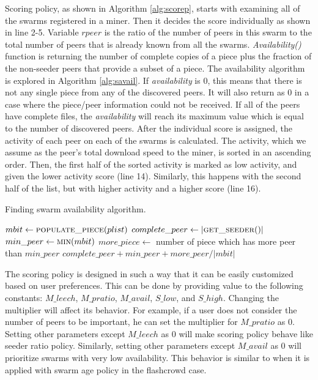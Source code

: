 Scoring policy, as shown in Algorithm \ref{alg:scorep}, starts with examining all of the swarms registered in a miner. Then it decides the score individually as shown in line 2-5. Variable $rpeer$ is the ratio of the number of peers in this swarm to the total number of peers that is already known from all the swarms. \textit{Availability()} function is returning the number of complete copies of a piece plus the fraction of the non-seeder peers that provide a subset of a piece. The availability algorithm is explored in Algorithm \ref{alg:savail}. If \textit{availability} is 0, this means that there is not any single piece from any of the discovered peers. It will also return as 0 in a case where the piece/peer information could not be received. If all of the peers have complete files, the \textit{availability} will reach its maximum value which is equal to the number of discovered peers. After the individual score is assigned, the activity of each peer on each of the swarms is calculated. The activity, which we assume as the peer's total download speed to the miner, is sorted in an ascending order. Then, the first half of the sorted activity is marked as low activity, and given the lower activity score (line 14). Similarly, this happens with the second half of the list, but with higher activity and a higher score (line 16).

\begin{algorithm}[h]
	\caption{Finding swarm availability algorithm.}
	\label{alg:savail}
	\begin{algorithmic}[1]
		\State $mbit \gets \Call{populate\_piece}{plist}$
		\State $complete\_peer \gets |\Call{get\_seeder}{\null}|$ 
		\State $min\_peer \gets \Call{min}{mbit}$
		\State $more\_piece \gets $ number of piece which has more peer than $min\_peer$
		\State \Return $complete\_peer + min\_peer + more\_peer/|mbit|$
	\end{algorithmic}
\end{algorithm}

The scoring policy is designed in such a way that it can be easily customized based on user preferences. This can be done by providing value to the following constants: $M\_leech$, $M\_pratio$, $M\_avail$, $S\_low$, and $S\_high$. Changing the multiplier will affect its behavior. For example, if a user does not consider the number of peers to be important, he can set the multiplier for $M\_pratio$ as 0. Setting other parameters except $M\_leech$ as 0 will make scoring policy behave like seeder ratio policy. Similarly, setting other parameters except $M\_avail$ as 0 will prioritize swarms with very low availability. This behavior is similar to when it is applied with swarm age policy in the flashcrowd case.

